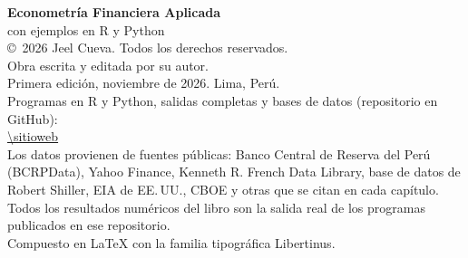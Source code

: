 \thispagestyle{plain}
\vspace*{\fill}
\begin{flushleft}\small
\textbf{Econometría Financiera Aplicada}\\
con ejemplos en R y Python\\[10pt]
\copyright\ 2026 Jeel Cueva. Todos los derechos reservados.\\
Obra escrita y editada por su autor.\\[10pt]
Primera edición, noviembre de 2026. Lima, Perú.\\[10pt]
Programas en R y Python, salidas completas y bases de datos (repositorio en GitHub):\\
\url{\sitioweb}\\[10pt]
Los datos provienen de fuentes públicas: Banco Central de Reserva del Perú (BCRPData), Yahoo Finance,
Kenneth R. French Data Library, base de datos de Robert Shiller, EIA de EE.\,UU., CBOE y otras que se
citan en cada capítulo. Todos los resultados numéricos del libro son la salida real de los programas
publicados en ese repositorio.\\[10pt]
Compuesto en \LaTeX{} con la familia tipográfica Libertinus.
\end{flushleft}
\clearpage
